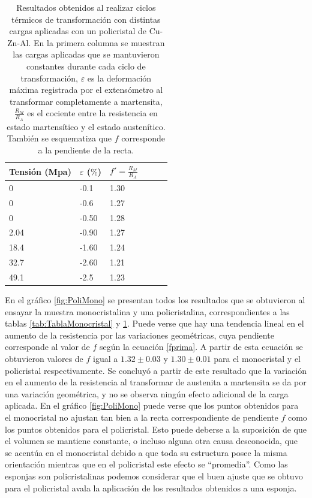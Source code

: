 \documentclass[a4paper,12pt,fleqn,twoside,openany]{book}
\begin{document}
\begin{table} 
\begin{center} 
\begin{tabular}{@{}llllll@{}} \toprule
Tensión (Mpa) & $\varepsilon$ ($\%$) &  $f'=\frac{R_M}{R_A}$\\ \midrule
 0        &  -0.1   & 1.30\\
 0       &  -0.6   & 1.27 \\
 0      &  -0.50   & 1.28 \\
 2.04      &  -0.90  & 1.27\\
 18.4    &  -1.60  & 1.24 \\
32.7      &  -2.60 & 1.21\\
 49.1     &  -2.5  & 1.23   \\
 \bottomrule
\end{tabular}
\caption{Resultados obtenidos al realizar ciclos térmicos de transformación con distintas cargas aplicadas con un policristal de Cu-Zn-Al. En la primera columna se muestran las cargas aplicadas que se mantuvieron constantes durante cada ciclo de transformación, $\varepsilon$ es la deformación máxima registrada por el extensómetro al transformar completamente a martensita, $\frac{R_M}{R_A}$ es el cociente entre la resistencia en estado martensítico y el estado austenítico. También se esquematiza que $f$ corresponde a la pendiente de la recta.}
\label{tab:TablaPolicristal}
\end{center}
\end{table}

En el gráfico \ref{fig:PoliMono} se presentan todos los resultados que se obtuvieron al ensayar la muestra monocristalina y una policristalina, correspondientes a las tablas \ref{tab:TablaMonocristal} y \ref{tab:TablaPolicristal}. Puede verse que hay una tendencia lineal en el aumento de la resistencia por las variaciones geométricas, cuya pendiente corresponde al valor de $f$ según la ecuación \ref{fprima}. A partir de esta ecuación se obtuvieron valores de $f$ igual a $1.32\pm0.03$ y $1.30 \pm 0.01$ para el monocristal y el policristal respectivamente.  Se concluyó a partir de este resultado que la variación en el aumento de la resistencia al transformar de austenita a martensita se da por una variación geométrica, y no se observa ningún efecto adicional de la carga aplicada.
En el gráfico \ref{fig:PoliMono} puede verse que los puntos obtenidos para el monocristal no ajustan tan bien a la recta correspondiente de pendiente $f$ como los puntos obtenidos para el policristal. Esto puede deberse a la suposición de que el volumen se mantiene constante, o incluso alguna otra causa desconocida, que se acentúa en el monocristal debido a que toda su estructura posee la misma orientación mientras que en el policristal este efecto se ``promedia''. Como las esponjas son policristalinas podemos considerar que el buen ajuste que se obtuvo para el policristal avala la aplicación de los resultados obtenidos a una esponja.
\end{document}

